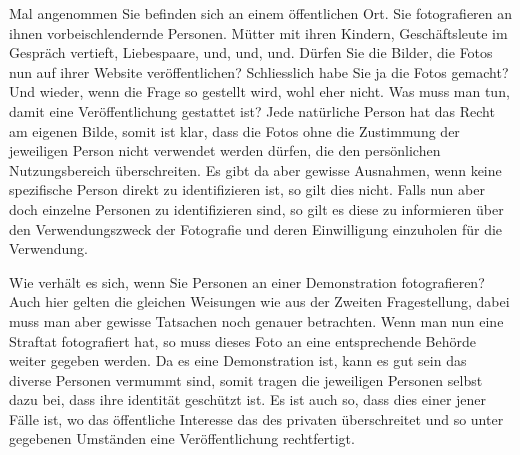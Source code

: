 Mal angenommen Sie befinden sich an einem öffentlichen Ort.
Sie fotografieren an ihnen vorbeischlendernde Personen.
Mütter mit ihren Kindern, Geschäftsleute im Gespräch vertieft, Liebespaare, und, und, und.
Dürfen Sie die Bilder, die Fotos nun auf ihrer Website veröffentlichen?
Schliesslich habe Sie ja die Fotos gemacht?\newline\newline
Und wieder, wenn die Frage so gestellt wird, wohl eher nicht.
Was muss man tun, damit eine Veröffentlichung gestattet ist?\newline\newline
Jede natürliche Person hat das Recht am eigenen Bilde, somit ist klar, dass die Fotos ohne die Zustimmung der jeweiligen
Person nicht verwendet werden dürfen, die den persönlichen Nutzungsbereich überschreiten.
Es gibt da aber gewisse Ausnahmen, wenn keine spezifische Person direkt zu identifizieren ist, so gilt dies nicht.
Falls nun aber doch einzelne Personen zu identifizieren sind, so gilt es diese zu informieren über den
Verwendungszweck der Fotografie und deren Einwilligung einzuholen für die Verwendung.

Wie verhält es sich, wenn Sie Personen an einer Demonstration fotografieren?\newline\newline
Auch hier gelten die gleichen Weisungen wie aus der \dq Zweiten Fragestellung\dq, dabei muss man aber gewisse Tatsachen noch
genauer betrachten.
Wenn man nun eine Straftat fotografiert hat, so muss dieses Foto an eine entsprechende Behörde weiter gegeben werden.
Da es eine Demonstration ist, kann es gut sein das diverse Personen vermummt sind, somit tragen die jeweiligen Personen
selbst dazu bei, dass ihre identität geschützt ist.
Es ist auch so, dass dies einer jener Fälle ist, wo das öffentliche Interesse das des privaten
überschreitet und so unter gegebenen Umständen eine Veröffentlichung rechtfertigt.



































